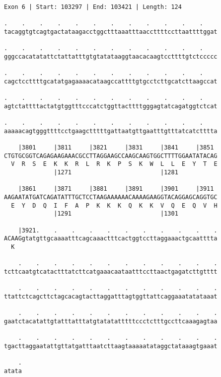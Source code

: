 \documentclass{article}
\begin{document}
\begin{Verbatim}[fontfamily=courier]
Exon 6 | Start: 103297 | End: 103421 | Length: 124

.    .    .    .    .    .    .    .    .    .    .    .    
tacaggtgtcagtgactataagacctggctttaaatttaaccttttccttaattttggat

.    .    .    .    .    .    .    .    .    .    .    .    
gggccacatatattctattatttgtgtatataaggtaacacaagtccttttgtctccccc

.    .    .    .    .    .    .    .    .    .    .    .    
cagctccttttgcatatgagaaaacataagccattttgtgcctcttgcatcttaagccat

.    .    .    .    .    .    .    .    .    .    .    .    
agtctattttactatgtggtttcccatctggttacttttgggagtatcagatggtctcat

.    .    .    .    .    .    .    .    .    .    .    .    
aaaaacagtgggttttcctgaagctttttgattaatgttgaatttgtttatcatctttta

    |3801     |3811     |3821     |3831     |3841     |3851 
CTGTGCGGTCAGAGAAGAAACGCCTTAGGAAGCCAAGCAAGTGGCTTTTGGAATATACAG
  V  R  S  E  K  K  R  L  R  K  P  S  K  W  L  L  E  Y  T  E
              |1271                         |1281           

    |3861     |3871     |3881     |3891     |3901     |3911 
AAGAATATGATCAGATATTTGCTCCTAAGAAAAAACAAAAGAAGGTACAGGAGCAGGTGC
  E  Y  D  Q  I  F  A  P  K  K  K  Q  K  K  V  Q  E  Q  V  H
              |1291                         |1301           

    |3921.    .    .    .    .    .    .    .    .    .    .
ACAAGgtatgttgcaaaatttcagcaaactttcactggtccttaggaaactgcaatttta
  K                                                         

    .    .    .    .    .    .    .    .    .    .    .    .
tcttcaatgtcatactttatcttcatgaaacaataatttccttaactgagatcttgtttt

    .    .    .    .    .    .    .    .    .    .    .    .
ttattctcagcttctagcacagtacttaggatttagtggttattcaggaaatatataaat

    .    .    .    .    .    .    .    .    .    .    .    .
gaatctacatattgtatttatttatgtatatatttttccctctttgccttcaaagagtaa

    .    .    .    .    .    .    .    .    .    .    .    .
tgacttaggaatattgttatgatttaatcttaagtaaaaatataggctataaagtgaaat

    .
atata
\end{Verbatim}
\newpage
\end{document}
